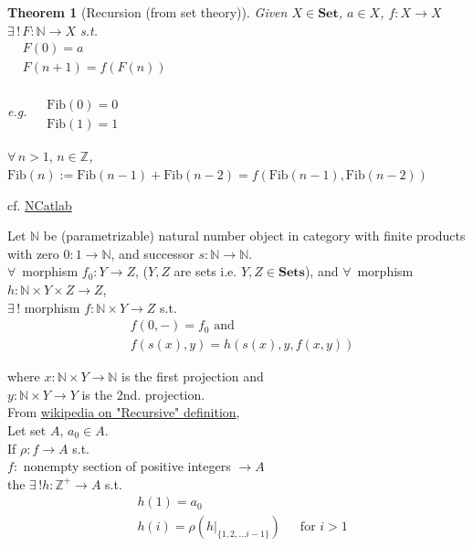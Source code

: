 \documentclass[10pt]{amsart}
\newtheorem{theorem}{Theorem}
\begin{document}
\begin{multicols*}{2}
\begin{theorem}[Recursion (from set theory)]
Given $X \in \textbf{Set}$, $a\in X$, $f:X \to X$ \\
$\exists \, ! \, F: \mathbb{N} \to X$ s.t. \\
$\begin{aligned}
& F(0) = a \\
& F(n+1) = f(F(n))
\end{aligned}$

e.g. $\begin{aligned} & \quad \\ 
	& \text{Fib}(0) = 0  \\
	& \text{Fib}(1) = 1 \end{aligned}$ 
	
	$\forall \, n > 1, \, n \in \mathbb{Z}$, $\text{Fib}(n) := \text{Fib}(n-1) + \text{Fib}(n-2) = f(\text{Fib}(n-1), \text{Fib}(n-2))$
\end{theorem} 

cf. \href{https://ncatlab.org/nlab/show/recursion}{NCatlab}

Let $\mathbb{N}$ be (parametrizable) natural number object in category with finite products with zero $0 : 1 \to \mathbb{N}$, and successor $s: \mathbb{N} \to \mathbb{N}$. \\
$\forall \, $ morphism $f_0 : Y \to Z$, ($Y, Z$ are sets i.e. $Y,Z \in \textbf{Sets}$), and $\forall \, $ morphism $h: \mathbb{N} \times Y \times Z \to Z$, \\
$\exists \, !$ morphism $f: \mathbb{N} \times Y \to Z$ s.t.
\begin{equation}
\begin{aligned} 
& f(0, -) = f_0 \text{ and } \\
& f(s(x), y) = h(s(x), y, f(x,y))
\end{aligned}
\end{equation}

where $x: \mathbb{N} \times Y \to \mathbb{N}$ is the first projection and \\
\phantom{where } $y : \mathbb{N} \times Y \to Y$ is the 2nd. projection.  \\

From \href{https://en.wikipedia.org/wiki/Recursive_definition}{wikipedia on "Recursive" definition}, \\
Let set $A$, $a_0 \in A$. \\
If $\rho : f \to A$ s.t. \\
\phantom{If $\rho $ } $f: $ nonempty section of positive integers $\to A$ \\
the $\exists \, ! h : \mathbb{Z}^+ \to A$ s.t. \\
\begin{equation}
\begin{aligned}
& h(1) = a_0 \\ 
& h(i) = \rho( \left. h \right|_{\lbrace 1, 2, \dots i -1 \rbrace }) \quad \, \text{ for } i > 1
\end{aligned}
\end{equation}



\end{multicols*}
\end{document}
